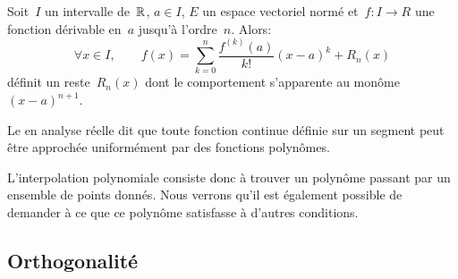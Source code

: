 \begin{theoreme}\label{Th-Taylor}
Soit~$I$ un intervalle de~$\mathbb R$, $a\in I$, $E$ un espace vectoriel normé et~$f: I\rightarrow R$ une fonction dérivable en~$a$ 
jusqu’à l’ordre~$n$. Alors:
\begin{equation}
\forall x\in I, \qquad
f(x) =\sum_{k=0}^n \frac{f^{(k)}(a)}{k!}(x-a)^k + R_n(x)
\end{equation}
définit un reste~$R_n(x)$ dont le comportement s'apparente au monôme~$(x-a)^{n+1}$.
\end{theoreme}
\medskipvm
Le  en analyse réelle dit que toute fonction continue définie sur un segment peut être approchée uniformément par des fonctions polynômes. 

L'interpolation polynomiale consiste donc à trouver un polynôme passant par un ensemble de points donnés. Nous verrons qu'il est également possible de demander à ce que ce polynôme satisfasse à d'autres conditions.
 
\medskip
\subsection{Orthogonalité} 

